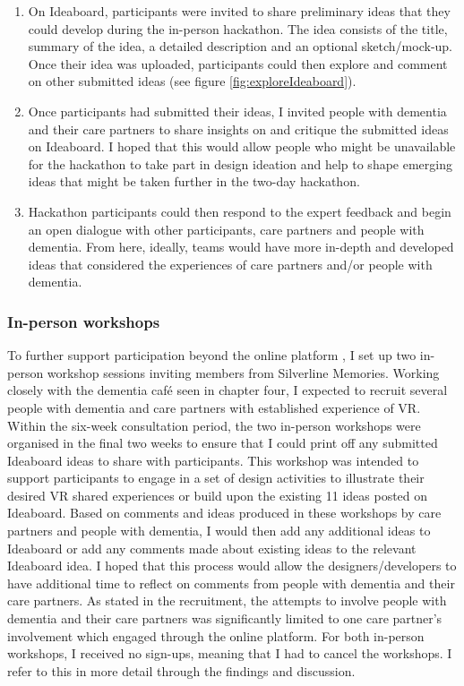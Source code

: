 \begin{enumerate}
    \item On Ideaboard, participants were invited to share preliminary ideas that they could develop during the in-person hackathon. The idea consists of the title, summary of the idea, a detailed description and an optional sketch/mock-up. Once their idea was uploaded, participants could then explore and comment on other submitted ideas  (see figure \ref{fig:exploreIdeaboard}).
    
    \item Once participants had submitted their ideas, I invited people with dementia and their care partners to share insights on and critique the submitted ideas on Ideaboard. I hoped that this would allow people who might be unavailable for the hackathon to take part in design ideation and help to shape emerging ideas that might be taken further in the two-day hackathon. 
    
    \item Hackathon participants could then respond to the expert feedback and begin an open dialogue with other participants, care partners and people with dementia. From here, ideally, teams would have more in-depth and developed ideas that considered the experiences of care partners and/or people with dementia. 
\end{enumerate}

\subsubsection{In-person workshops}
\label{sec:in-personWorkshops}
To further support participation beyond the online platform \citep{piper2016technological}, I set up two in-person workshop sessions inviting members from Silverline Memories. Working closely with the dementia café seen in chapter four, I expected to recruit several people with dementia and care partners with established experience of VR. Within the six-week consultation period, the two in-person workshops were organised in the final two weeks to ensure that I could print off any submitted Ideaboard ideas to share with participants.  This workshop was intended to support participants to engage in a set of design activities to illustrate their desired VR shared experiences or build upon the existing 11 ideas posted on Ideaboard. Based on comments and ideas produced in these workshops by care partners and people with dementia, I would then add any additional ideas to Ideaboard or add any comments made about existing ideas to the relevant Ideaboard idea. I hoped that this process would allow the designers/developers to have additional time to reflect on comments from people with dementia and their care partners. As stated in the recruitment, the attempts to involve people with dementia and their care partners was significantly limited to one care partner’s involvement which engaged through the online platform. For both in-person workshops, I received no sign-ups, meaning that I had to cancel the workshops. I refer to this in more detail through the findings and discussion.

